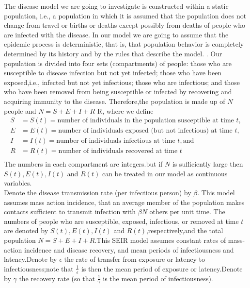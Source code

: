 \documentclass{exam}
\begin{document}
\begin{itemize}
	The disease model we are going to investigate is constructed within a static population, i.e., a population in which it is assumed that the population does not change from travel or births or deaths except possibly from deaths of people who are infected with the disease. In our model we are going to assume that the epidemic process is deterministic, that is, that population behavior is completely determined by its history and by the rules that describe the model.
	. Our population is divided into four sets (compartments) of people: those who are susceptible to disease infection but not yet infected; those who have been exposed,i.e., infected but not yet infectious; those who are infectious; and those who have been removed from being susceptible or infected by recovering and acquiring immunity to the disease.
	Therefore,the population is made up of $N$ people and $N=S+E+I+R$ R, where we define 
	\begin{align*}
	S&=S(t) = \text{number of individuals in the population susceptible at time } t,\\
	E&=E(t)=  \text{number of individuals exposed (but not infectious) at time } t,\\
	I&=I(t)= \text{number of individuals infectious at time  } t, \text{and}\\
	R&=R(t)= \text{number of individuals recovered at time } t\\
	\end{align*}
	The numbers in each compartment are integers.but if $N$ is sufficiently large then  $S(t),E(t),I(t)$ and $R(t)$ can be treated in our model as continuous variables.\\
	
	Denote the disease transmission rate (per infectious person) by $\beta$. This model assumes mass action incidence, that an average member of the population makes contacts sufficient to transmit infection with $\beta N$ others per unit time.   
	The numbers of people who are susceptible, exposed, infectious, or removed at time  $t$	are denoted by $S(t),E(t),I(t)$ and $R(t)$,respectively,and the total population $N=S+E+I+R$.This SEIR model assumes constant rates of mass-action incidence and disease recovery, and mean periods of infectiousness and latency.Denote by $\epsilon$ the rate of transfer from exposure or latency to infectiousness;note that $\frac{1}{\epsilon}$ is then the mean	period of exposure or latency.Denote by $\gamma$ the recovery rate (so that $\frac{1}{\gamma}$ is the mean period of infectiousness).\\
	

\end{itemize}
\end{document}
